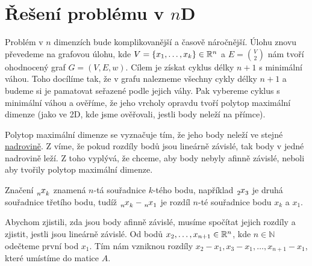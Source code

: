 \section{Řešení problému v \texorpdfstring{$n$D}{nD}}
\label{sec:reseni_1D}
Problém v $n$ dimenzích bude komplikovanější a časově náročnější. Úlohu znovu převedeme na grafovou úlohu, kde $V = \{x_1,\ldots, x_k\} \in \mathbb{R}^n$ a $E = \binom{V}{2}$ nám tvoří ohodnocený graf $G = (V, E, w)$. Cílem je získat cyklus délky $n+1$ s minimální váhou.
Toho docílíme tak, že v grafu nalezneme všechny cykly délky $n+1$ a budeme si je pamatovat seřazené podle jejich váhy. Pak vybereme cyklus s minimální váhou a ověříme, že jeho vrcholy opravdu tvoří polytop maximální dimenze (jako ve 2D, kde jsme ověřovali, jestli body neleží na přímce).

Polytop maximální dimenze se vyznačuje tím, že jeho body neleží ve stejné \hyperref[definice:nadrovina]{nadrovině}. Z  víme, že pokud rozdíly bodů jsou lineárně závislé, tak body v jedné nadrovině leží. Z toho vyplývá, že chceme, aby body nebyly afinně závislé, neboli aby tvořily polytop maximální dimenze.  

\begin{poznamka} 
  \label{poznamka:varovani_index}
  Značení $\x{n}{k}$ znamená $n$-tá souřadnice $k$-tého bodu, například $\x{2}{3}$ je dru\-há souřadnice třetího bodu, tudíž $\x{n}{k} - \x{n}{1}$ je rozdíl $n$-té souřadnice bodu $x_k$ a $x_1$. 
\end{poznamka}

Abychom zjistili, zda jsou body afinně závislé, musíme spočítat jejich rozdíly a zjistit, jestli jsou lineárně závislé. Od bodů $x_2, \ldots, x_{n+1} \in \mathbb{R}^n$, kde  $n \in \mathbb{N}$ odečteme první bod $x_1$. Tím nám vzniknou rozdíly $x_2-x_1, x_3-x_1, \dots, x_{n+1}-x_1$, které umístíme do matice $A$. 


